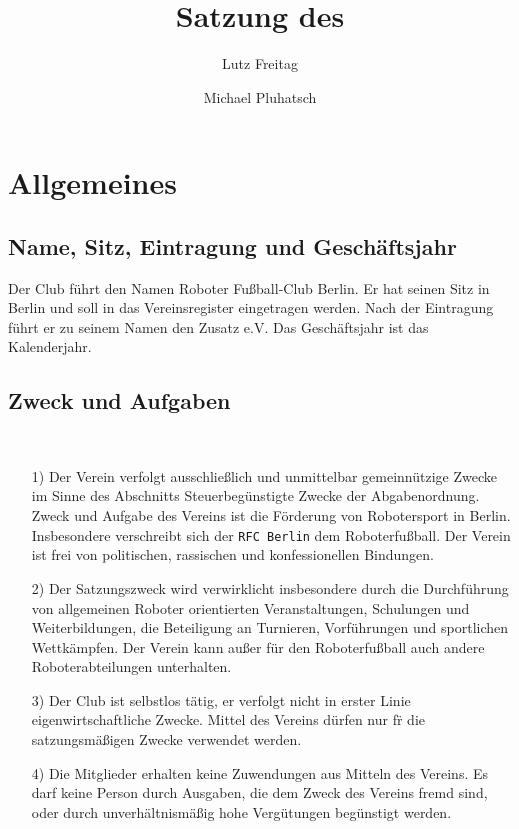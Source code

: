 \documentclass[11pt,a4paper]{scrartcl}
\author{Lutz Freitag \and Michael Pluhatsch}
\title{Satzung des \RFC}
\newcommand{\RFC}{\texttt{RFC Berlin}\xspace}
\begin{document}
\maketitle
\section{Allgemeines}
\subsection{Name, Sitz, Eintragung und Gesch\"aftsjahr}\label{sec:scope}
Der Club f\"uhrt den Namen \glqq Roboter Fu{\ss}ball-Club Berlin\grqq. Er hat seinen Sitz in Berlin und 
soll in das Vereinsregister eingetragen werden. Nach der Eintragung f\"uhrt er zu seinem Namen den Zusatz e.V. Das Gesch\"aftsjahr ist das Kalenderjahr.

\subsection{Zweck und Aufgaben}~\label{sec:purpose}
\begin{itemize}
    \item[1)] Der  Verein  verfolgt  ausschließlich  und  unmittelbar  gemeinnützige Zwecke  im  Sinne  des Abschnitts \glqq Steuerbeg\"unstigte Zwecke\grqq{} der Abgabenordnung. Zweck und Aufgabe des Vereins ist die F\"orderung von Robotersport in Berlin. Insbesondere verschreibt sich der \RFC dem Roboterfu{\ss}ball. Der Verein ist frei von politischen, rassischen und konfessionellen Bindungen. 
    \item[2)] Der Satzungszweck wird verwirklicht insbesondere durch die Durchführung von allgemeinen Roboter orientierten Veranstaltungen, Schulungen und Weiterbildungen, die Beteiligung an Turnieren, Vorführungen und sportlichen Wettkämpfen. Der Verein kann außer für den Roboterfu{\ss}ball auch andere Roboterabteilungen unterhalten. 
 	\item[3)] Der Club ist selbstlos t\"atig, er verfolgt nicht in erster Linie eigenwirtschaftliche Zwecke. Mittel des Vereins d\"urfen nur f\"r die satzungsmäßigen Zwecke verwendet werden.
 	\item[4)] Die Mitglieder  erhalten  keine  Zuwendungen  aus  Mitteln  des  Vereins.  Es  darf  keine  Person durch Ausgaben, die dem Zweck des Vereins fremd sind, oder durch unverh\"altnismäßig hohe Vergütungen beg\"unstigt werden.
\end{itemize}
\end{document}

